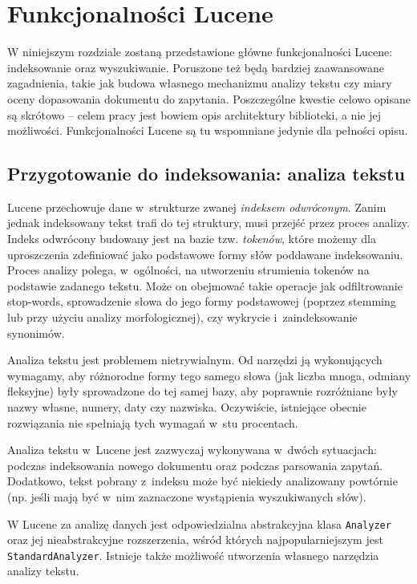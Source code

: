 \chapter{Funkcjonalności Lucene}

W niniejszym rozdziale zostaną przedstawione główne funkcjonalności Lucene: indeksowanie oraz wyszukiwanie. Poruszone też będą bardziej zaawansowane zagadnienia, takie jak budowa własnego mechanizmu analizy tekstu czy miary oceny dopasowania dokumentu do zapytania. Poszczególne kwestie celowo opisane są skrótowo -- celem pracy jest bowiem opis architektury biblioteki, a nie jej możliwości. Funkcjonalności Lucene są tu wspomniane jedynie dla pełności opisu.

\section{Przygotowanie do indeksowania: analiza tekstu}

Lucene przechowuje dane w~strukturze zwanej \emph{indeksem odwróconym}. Zanim jednak indeksowany tekst trafi do tej struktury, musi przejść przez proces analizy. Indeks odwrócony budowany jest na bazie tzw. \emph{tokenów}, które możemy dla uproszczenia zdefiniować jako podstawowe formy słów poddawane indeksowaniu. Proces analizy polega, w~ogólności, na utworzeniu strumienia tokenów na podstawie zadanego tekstu. Może on obejmować takie operacje jak odfiltrowanie stop-words, sprowadzenie słowa do jego formy podstawowej (poprzez stemming lub przy użyciu analizy morfologicznej), czy wykrycie i~zaindeksowanie synonimów. 

Analiza tekstu jest problemem nietrywialnym. Od narzędzi ją wykonujących wymagamy, aby różnorodne formy tego samego słowa (jak liczba mnoga, odmiany fleksyjne) były sprowadzone do tej samej bazy, aby poprawnie rozróżniane były nazwy własne, numery, daty czy nazwiska. Oczywiście, istniejące obecnie rozwiązania nie spełniają tych wymagań w~stu procentach.

Analiza tekstu w~Lucene jest zazwyczaj wykonywana w~dwóch sytuacjach: podczas indeksowania nowego dokumentu oraz podczas parsowania zapytań. Dodatkowo, tekst pobrany z~indeksu może być niekiedy analizowany powtórnie (np. jeśli mają być w~nim zaznaczone wystąpienia wyszukiwanych słów).

W Lucene za analizę danych jest odpowiedzialna abstrakcyjna klasa \texttt{Analyzer} oraz jej nieabstrakcyjne rozszerzenia, wśród których najpopularniejszym jest \texttt{StandardAnalyzer}. Istnieje także możliwość utworzenia własnego narzędzia analizy tekstu. 

